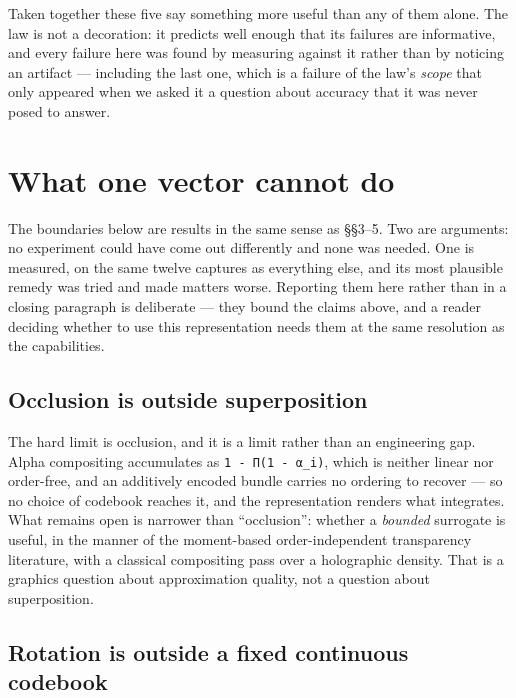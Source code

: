 \documentclass[11pt]{article}
\begin{document}
Taken together these five say something more useful than any of them
alone. The law is not a decoration: it predicts well enough that its
failures are informative, and every failure here was found by measuring
against it rather than by noticing an artifact --- including the last
one, which is a failure of the law's \emph{scope} that only appeared
when we asked it a question about accuracy that it was never posed to
answer.

\section{What one vector cannot do}

The boundaries below are results in the same sense as \S\S3--5. Two are
arguments: no experiment could have come out differently and none was
needed. One is measured, on the same twelve captures as everything else,
and its most plausible remedy was tried and made matters worse.
Reporting them here rather than in a closing paragraph is deliberate ---
they bound the claims above, and a reader deciding whether to use this
representation needs them at the same resolution as the capabilities.

\subsection{Occlusion is outside superposition}

The hard limit is occlusion, and it is a limit rather than an
engineering gap. Alpha compositing accumulates as \texttt{1 - Π(1 -
α\_i)}, which is neither linear nor order-free, and an additively
encoded bundle carries no ordering to recover --- so no choice of
codebook reaches it, and the representation renders what integrates.
What remains open is narrower than ``occlusion'': whether a
\emph{bounded} surrogate is useful, in the manner of the moment-based
order-independent transparency literature, with a classical compositing
pass over a holographic density. That is a graphics question about
approximation quality, not a question about superposition.

\subsection{Rotation is outside a fixed continuous codebook}
\end{document}
